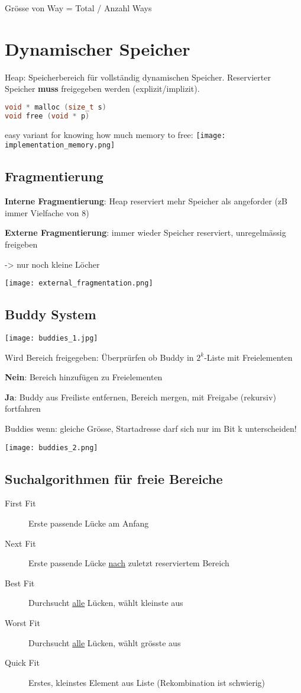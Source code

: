 \begin{multicols*}{4}
Grösse von Way = Total / Anzahl Ways

\section{Dynamischer Speicher}
Heap: Speicherbereich für vollständig dynamischen Speicher. Reservierter Speicher \textbf{muss} freigegeben werden (explizit/implizit).

\begin{lstlisting}[language=c]
void * malloc (size_t s)
void free (void * p)
\end{lstlisting}

easy variant for knowing how much memory to free:
\texttt{[image: implementation\_memory.png]}

\subsection{Fragmentierung}
\textbf{Interne Fragmentierung}: Heap reserviert mehr Speicher als angeforder (zB immer Vielfache von 8)

\textbf{Externe Fragmentierung}: immer wieder Speicher reserviert, unregelmässig freigeben

-> nur noch kleine Löcher

\texttt{[image: external\_fragmentation.png]}

\subsection{Buddy System}

\texttt{[image: buddies\_1.jpg]}

Wird Bereich freigegeben: Überprürfen ob Buddy in \(2^k\)-Liste mit Freielementen

\textbf{Nein}: Bereich hinzufügen zu Freielementen

\textbf{Ja}: Buddy aus Freiliste entfernen, Bereich mergen, mit Freigabe (rekursiv) fortfahren

Buddies wenn: gleiche Grösse, Startadresse darf sich nur im Bit k unterscheiden!

\hfill\texttt{[image: buddies\_2.png]}

\subsection{Suchalgorithmen für freie Bereiche}
\begin{description}
    \item[First Fit] Erste passende Lücke am Anfang
    \item[Next Fit] Erste passende Lücke \underline{nach} zuletzt reserviertem Bereich
    \item[Best Fit] Durchsucht \underline{alle} Lücken, wählt kleinste aus
    \item[Worst Fit] Durchsucht \underline{alle} Lücken, wählt grösste aus
    \item[Quick Fit] Erstes, kleinstes Element aus Liste
    (Rekombination ist schwierig)
\end{description}


\end{multicols*}
